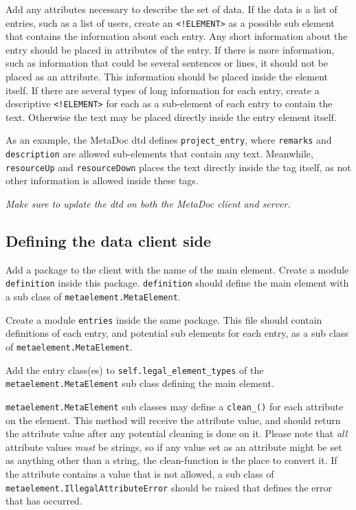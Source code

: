 Add any attributes necessary to describe the set of data. If the data is a list
of entries, such as a list of users, create an \texttt{<!ELEMENT>} as a
possible sub element that contains the information about each entry. Any short
information about the entry should be placed in attributes of the entry. If
there is more information, such as information that could be several sentences
or lines, it should not be placed as an attribute. This information should be
placed inside the element itself. If there are several types of long
information for each entry, create a descriptive \texttt{<!ELEMENT>} for each
as a sub-element of each entry to contain the text. Otherwise the text may be
placed directly inside the entry element itself. 

As an example, the MetaDoc \gls{dtd} \cite{metadoc_dtd} defines
\texttt{project\_entry}, where \texttt{remarks} and \texttt{description} are
allowed sub-elements that contain any text. Meanwhile, \texttt{resourceUp} and
\texttt{resourceDown} places the text directly inside the tag itself, as not
other information is allowed inside these tags.

\textit{Make sure to update the \gls{dtd} on both the MetaDoc client and server.}

\subsection{Defining the data client side}
\label{sec:defclientmodel}
Add a package \cite{python_modules} to the client with the name of the main
element. Create a module \texttt{definition} inside this package.
\texttt{definition} should define the main element with a sub class of
\texttt{metaelement.MetaElement}.

Create a module \texttt{entries} inside the same package. This file should
contain definitions of each entry, and potential sub elements for each entry,
as a sub class of \texttt{metaelement.MetaElement}. 

Add the entry class(es) to \texttt{self.legal\_element\_types} of the \\ 
\texttt{metaelement.MetaElement} sub class defining the main element. 

\texttt{metaelement.MetaElement} sub classes may define a
\texttt{clean\_<attribute name>()} for each attribute on the element. This
method will receive the attribute value, and should return the attribute value
after any potential cleaning is done on it. Please note that \textit{all}
attribute values \textit{must} be strings, so if any value set as an attribute
might be set as anything other than a string, the clean-function is the place
to convert it. If the attribute contains a value that is not allowed, a sub
class of \texttt{metaelement.IllegalAttributeError} should be raised that
defines the error that has occurred. 

